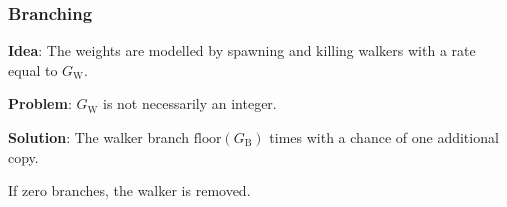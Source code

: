 \begin{frame}
\frametitle{Branching}

\textbf{Idea}: The weights are modelled by spawning and killing walkers with a rate equal to $G_\mathrm{W}$. 
\shift

\textbf{Problem}: $G_\mathrm{W}$ is not necessarily an integer.
\shift

\textbf{Solution}: The walker branch $\mathrm{floor}(G_\mathrm{B})$ times with a chance of one additional copy.


\vspace{0.5cm}
If zero branches, the walker is removed.

% 
% 
% 

\end{frame}



